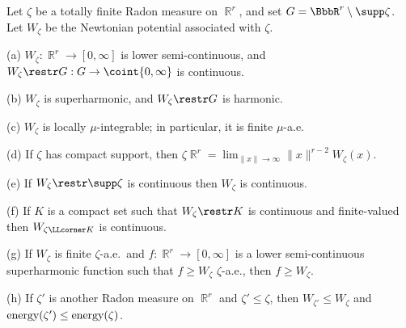  Let $\zeta$ be a totally finite Radon measure on
$\BbbR^r$, and set $G=\BbbR^r\setminus\supp\zeta$.   Let $W_{\zeta}$ be the
Newtonian potential associated with $\zeta$.

(a) $W_{\zeta}:\BbbR^r\to[0,\infty]$ is lower semi-continuous,
and $W_{\zeta}\restr G:G\to\coint{0,\infty}$ is continuous.

(b) $W_{\zeta}$ is superharmonic, and $W_{\zeta}\restr G$ is harmonic.

(c) $W_{\zeta}$ is locally $\mu$-integrable;  in particular, it is finite
$\mu$-a.e.

(d) If $\zeta$ has compact support, then
$\zeta\BbbR^r=\lim_{\|x\|\to\infty}\|x\|^{r-2}W_{\zeta}(x)$.

(e) If $W_{\zeta}\restr\supp\zeta$ is continuous then $W_{\zeta}$ is
continuous.

(f) If $K$ is a compact set such that $W_{\zeta}\restr K$ is continuous
and finite-valued then $W_{\zeta\LLcorner K}$ is continuous.

(g) If $W_{\zeta}$ is finite $\zeta$-a.e.\ and
$f:\BbbR^r\to[0,\infty]$ is a lower semi-continuous superharmonic
function such that $f\ge W_{\zeta}\,\,\zeta$-a.e., then $f\ge W_{\zeta}$.

(h) If $\zeta'$ is another Radon measure on $\BbbR^r$ and
$\zeta'\le\zeta$, then $W_{\zeta'}\le W_{\zeta}$ and
$\mathop{\text{energy}}\nolimits(\zeta')\le\mathop{\text{energy}}\nolimits(\zeta)$.


